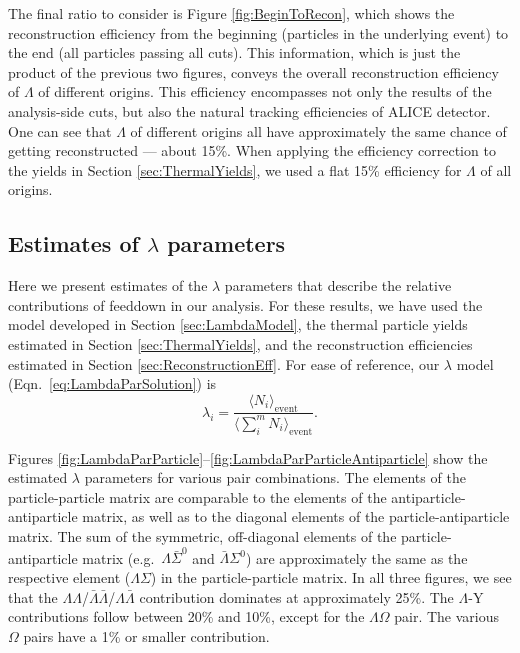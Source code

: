 The final ratio to consider is Figure \ref{fig:BeginToRecon}, which shows the reconstruction efficiency from the beginning (particles in the underlying event) to the end (all particles passing all cuts).
This information, which is just the product of the previous two figures, conveys the overall reconstruction efficiency of $\Lambda$ of different origins.
This efficiency encompasses not only the results of the analysis-side cuts, but also the natural tracking efficiencies of ALICE detector.  
One can see that $\Lambda$ of different origins all have approximately the same chance of getting reconstructed --- about 15\%.
When applying the efficiency correction to the yields in Section \ref{sec:ThermalYields}, we used a flat 15\% efficiency for $\Lambda$ of all origins.

\subsection{Estimates of \texorpdfstring{$\lambda$}{lambda} parameters}
\label{sec:LambdaParamEstimates}

Here we present estimates of the $\lambda$ parameters that describe the relative contributions of feeddown in our analysis.
For these results, we have used the model developed in Section \ref{sec:LambdaModel}, the thermal particle yields estimated in Section \ref{sec:ThermalYields}, and the reconstruction efficiencies estimated in Section \ref{sec:ReconstructionEff}.
For ease of reference, our $\lambda$ model (Eqn.\ \ref{eq:LambdaParSolution}) is
$$\lambda_i = \frac{\langle N_{i}\rangle_{\mathrm{event}}} {\langle\sum_i^m N_{i}\rangle_{\mathrm{event}}}.$$

Figures \ref{fig:LambdaParParticle}--\ref{fig:LambdaParParticleAntiparticle} show the estimated $\lambda$ parameters for various pair combinations. 
The elements of the particle-particle matrix are comparable to the elements of the antiparticle-antiparticle matrix, as well as to the diagonal elements of the particle-antiparticle matrix.
The sum of the symmetric, off-diagonal elements of the particle-antiparticle matrix (e.g.\ $\Lambda\bar{\Sigma}^0$ and $\bar{\Lambda}\Sigma^0$) are approximately the same as the respective element ($\Lambda\Sigma$) in the particle-particle matrix.
In all three figures, we see that the $\Lambda\Lambda$/$\bar{\Lambda}\bar{\Lambda}$/$\Lambda\bar{\Lambda}$ contribution dominates at approximately 25\%. The $\Lambda$-Y contributions follow between 20\% and 10\%, except for the $\Lambda\Omega$ pair. The various $\Omega$ pairs have a 1\% or smaller contribution. 


